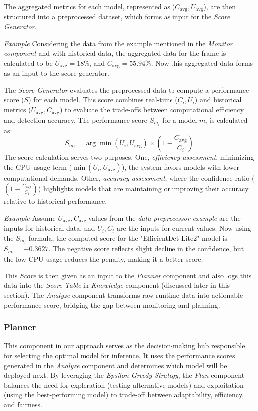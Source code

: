 The aggregated metrics for each model, represented as (\(C_\text{avg}, U_\text{avg}\)), are then structured into a preprocessed dataset, which forms as input for the \textit{Score Generator}.

\textit{Example} Considering the data from the example mentioned in the \textit{Monitor component} and with historical data, the aggregated data for the frame is calculated to be \(U_\text{avg} = 18\%\), and \(C_\text{avg} = 55.94\%\). Now this aggregated data forms as an input to the score generator.

The \textit{Score Generator} evaluates the preprocessed data to compute a performance score (\(S\)) \cite{b5} for each model. This score combines real-time (\(C_i, U_i\)) and historical metrics (\(U_\text{avg}, C_\text{avg}\)) to evaluate the trade-offs between computational efficiency and detection accuracy. The performance score \(S_{m_i}\) for a model \(m_i\) is calculated as:
\[
S_{m_i} = \arg\min(U_i, U_\text{avg}) \times (1 - \frac{C_\text{avg}}{C_i})
\]
The score calculation serves two purposes. One, \textit{efficiency assessment}, minimizing the CPU usage term (\(\min(U_i, U_\text{avg})\)), the system favors models with lower computational demands. Other, \textit{accuracy assessment}, where the confidence ratio (\((1 - \frac{C_\text{avg}}{C_i})\)) highlights models that are maintaining or improving their accuracy relative to historical performance. 

\textit{Example} Assume \( U_\text{avg}, C_\text{avg}\) values from the \textit{data preprocessor example} are the inputs for historical data, and  \(U_i, C_i\) are the inputs for current values. Now using the \(S_{m_i}\) formula, the computed score for the "EfficientDet Lite2" model is \(S_{m_i} = -0.3627\). The negative score reflects slight decline in the confidence, but the low CPU usage reduces the penalty, making it a better score. 

This \textit{Score} is then given as an input to the \textit{Planner} component and also logs this data into the \textit{Score Table} in \textit{Knowledge} component (discussed later in this section). The \textit{Analyze} component transforms raw runtime data into actionable performance score, bridging the gap between monitoring and planning.

\subsubsection{\textbf{Planner}}

This component in our approach serves as the decision-making hub responsible for selecting the optimal model for inference. It uses the performance scores generated in the \textit{Analyze} component and determines which model will be deployed next. By leveraging the \textit{Epsilon-Greedy Strategy}, the \textit{Plan} component balances the need for exploration (testing alternative models) and exploitation (using the best-performing model) to trade-off between adaptability, efficiency, and fairness. 


